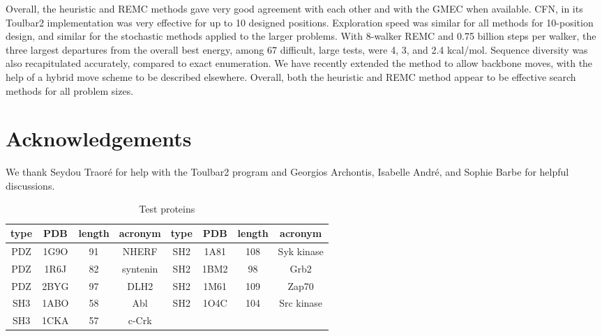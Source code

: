 {{Overall, the heuristic and REMC methods gave very good agreement with each other and with the GMEC when available.
CFN, in its Toulbar2 implementation was very effective for up to 10 designed positions. Exploration speed was similar
for all methods for 10-position design, and similar for the stochastic methods applied to the larger problems. With
8-walker REMC and 0.75 billion steps per walker, the three largest departures from the overall best energy, among 67
difficult, large tests, were 4, 3, and 2.4 kcal/mol. Sequence diversity was also recapitulated accurately, compared to
exact enumeration. We have recently extended the method to allow backbone moves, with the help of a hybrid move
scheme to be described elsewhere. Overall, both the heuristic and REMC method appear to be effective search methods
for all problem sizes.

\section*{Acknowledgements}
We thank Seydou Traor\'e for help with the Toulbar2 program and Georgios Archontis, Isabelle Andr\'e, and Sophie Barbe
for helpful discussions.

\small 



\begin{table}[!htbp]                            
\caption{Test proteins}
\label{tab:proteins}                      
\begin{center}
\begin{tabular}{cccccccc} \hline \hline  
type & PDB  & length & acronym  & type & PDB  & length & acronym \\ \hline
PDZ  & 1G9O &  91    & NHERF    & SH2  & 1A81 & 108    & Syk kinase \\ 
PDZ  & 1R6J &  82    & syntenin & SH2  & 1BM2 &  98    & Grb2       \\
PDZ  & 2BYG &  97    & DLH2     & SH2  & 1M61 & 109    & Zap70      \\
SH3  & 1ABO &  58    & Abl      & SH2  & 1O4C & 104    & Src kinase \\
SH3  & 1CKA &  57    & c-Crk    &      &      &        &     \\ \hline
\end{tabular}
\end{center}
\end{table}


}}
